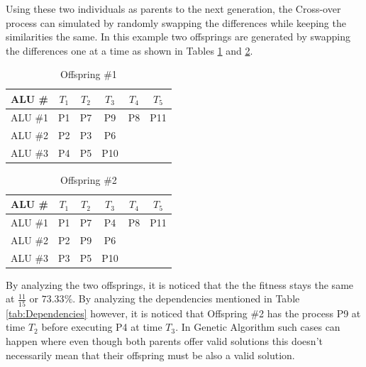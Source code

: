 \documentclass[conference]{IEEEtran}
\begin{document}
Using these two individuals as parents to the next generation, the Cross-over process can simulated by randomly swapping the differences while keeping the similarities the same. In this example two offsprings are generated by swapping the differences one at a time as shown in Tables \ref{tab:offspring-1} and \ref{tab:offspring-2}.

\begin{table}[h!]
    \centering
    \begin{tabular}{|c|c|c|c|c|c|}
        \hline
    ALU \#  & $T_1$ & $T_2$ &  $T_3$& $T_4$ & $T_5$ \\
    \hline
       ALU \#1  &\cellcolor[HTML]{51C004} P1 &\cellcolor[HTML]{51C004} P7 & P9& \cellcolor[HTML]{51C004}P8 & \cellcolor[HTML]{51C004}P11\\
       \hline
       ALU \#2  &  \cellcolor[HTML]{51C004}P2 & P3 & \cellcolor[HTML]{51C004}P6 &  &\\
       \hline
       ALU \#3  & P4 & \cellcolor[HTML]{51C004}P5  & \cellcolor[HTML]{51C004}P10 &  & \\
       \hline
    \end{tabular}
           \vspace{2pt}
    \caption{Offspring \#1}
    \label{tab:offspring-1}
\end{table}
\begin{table}[h!]
    \centering
    \begin{tabular}{|c|c|c|c|c|c|}
    \hline
    ALU \#  & $T_1$ & $T_2$ &  $T_3$& $T_4$ & $T_5$ \\
        \hline
       ALU \#1  & \cellcolor[HTML]{51C004}P1 &\cellcolor[HTML]{51C004} P7 & P4&\cellcolor[HTML]{51C004} P8 &\cellcolor[HTML]{51C004} P11\\
       \hline
       ALU \#2  & \cellcolor[HTML]{51C004} P2 & P9 & \cellcolor[HTML]{51C004}P6 &  &\\
       \hline
       ALU \#3  & P3 & \cellcolor[HTML]{51C004}P5  &\cellcolor[HTML]{51C004} P10 &  & \\
       \hline
    \end{tabular}
           \vspace{2pt}
    \caption{Offspring \#2}
    \label{tab:offspring-2}
\end{table}
By analyzing the two offsprings, it is noticed that the the fitness stays the same at $\frac{11}{15}$ or $73.33\%$. By analyzing the dependencies mentioned in Table \ref{tab:Dependencies} however, it is noticed that Offspring \#2 has the process P9 at time $T_2$ before executing P4 at time $T_3$. In Genetic Algorithm such cases can happen where even though both parents offer valid solutions this doesn't necessarily mean that their offspring must be also a valid solution.
\end{document}

